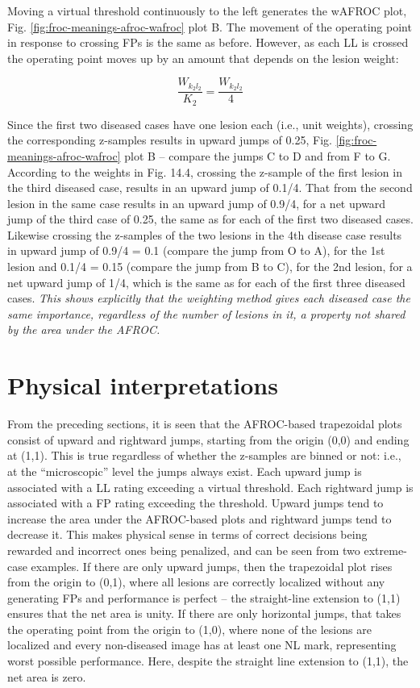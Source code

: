 \documentclass[
]{book}
\begin{document}
Moving a virtual threshold continuously to the left generates the wAFROC plot, Fig. \ref{fig:froc-meanings-afroc-wafroc} plot B. The movement of the operating point in response to crossing FPs is the same as before. However, as each LL is crossed the operating point moves up by an amount that depends on the lesion weight:

\[\frac{W_{k_2 l_2}}{K_2} = \frac{W_{k_2 l_2}}{4}\]

Since the first two diseased cases have one lesion each (i.e., unit weights), crossing the corresponding z-samples results in upward jumps of 0.25, Fig. \ref{fig:froc-meanings-afroc-wafroc} plot B -- compare the jumps C to D and from F to G. According to the weights in Fig. 14.4, crossing the z-sample of the first lesion in the third diseased case, results in an upward jump of 0.1/4. That from the second lesion in the same case results in an upward jump of 0.9/4, for a net upward jump of the third case of 0.25, the same as for each of the first two diseased cases. Likewise crossing the z-samples of the two lesions in the 4th disease case results in upward jump of 0.9/4 = 0.1 (compare the jump from O to A), for the 1st lesion and 0.1/4 = 0.15 (compare the jump from B to C), for the 2nd lesion, for a net upward jump of 1/4, which is the same as for each of the first three diseased cases. \emph{This shows explicitly that the weighting method gives each diseased case the same importance, regardless of the number of lesions in it, a property not shared by the area under the AFROC.}

\hypertarget{froc-meanings-physical-interpretions}{%
\section{Physical interpretations}\label{froc-meanings-physical-interpretions}}

From the preceding sections, it is seen that the AFROC-based trapezoidal plots consist of upward and rightward jumps, starting from the origin (0,0) and ending at (1,1). This is true regardless of whether the z-samples are binned or not: i.e., at the ``microscopic'' level the jumps always exist. Each upward jump is associated with a LL rating exceeding a virtual threshold. Each rightward jump is associated with a FP rating exceeding the threshold. Upward jumps tend to increase the area under the AFROC-based plots and rightward jumps tend to decrease it. This makes physical sense in terms of correct decisions being rewarded and incorrect ones being penalized, and can be seen from two extreme-case examples. If there are only upward jumps, then the trapezoidal plot rises from the origin to (0,1), where all lesions are correctly localized without any generating FPs and performance is perfect -- the straight-line extension to (1,1) ensures that the net area is unity. If there are only horizontal jumps, that takes the operating point from the origin to (1,0), where none of the lesions are localized and every non-diseased image has at least one NL mark, representing worst possible performance. Here, despite the straight line extension to (1,1), the net area is zero.
\end{document}
